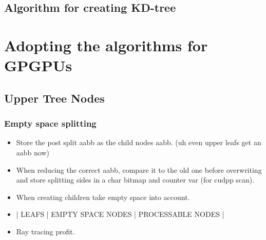 


\subsection{Algorithm for creating KD-tree}




\section{Adopting the algorithms for GPGPUs}





\subsection{Upper Tree Nodes}




\subsubsection{Empty space splitting}

\begin{itemize}
  \item Store the post split aabb as the child nodes aabb. (uh even
    upper leafs get an aabb now)
  \item When reducing the correct aabb, compare it to the old one
    before overwriting and store splitting sides in a char bitmap and counter var (for cudpp scan).
  \item When creating children take empty space into account.
  \item | LEAFS | EMPTY SPACE NODES | PROCESSABLE NODES |
  \item Ray tracing profit.
\end{itemize}

